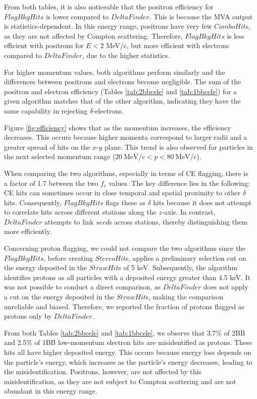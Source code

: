 From both tables, it is also noticeable that the positron 
efficiency for $FlagBkgHits$ is lower compared to $DeltaFinder$. 
This is because the MVA output is statistics-dependent. In this 
energy range, positrons have very few $ComboHit$s, as 
they are not affected by Compton scattering. Therefore, 
$FlagBkgHits$ is less efficient with positrons for $E < 2$ MeV/c, 
but more efficient with electrons compared to 
$DeltaFinder$, due to the higher statistics.

For higher momentum values, both algorithms perform similarly and the 
differences between positrons and electrons become negligible.  
The sum of the positron and electron efficiency (Tables \ref{tab:2bbcele} 
and \ref{tab:1bbcele}) for a given algorithm 
matches that of the other algorithm, indicating they have the same 
capability in rejecting $\delta$-electrons. 

Figure \ref{fig:efficiency} shows that as the momentum 
increases, the efficiency decreases. This occurs because 
higher momenta correspond to larger radii and a 
greater spread of hits on the $x$-$y$ plane. 
This trend is also observed for particles in the 
next selected momentum range ($20 \ \text{MeV/c} <p<80 \ \text{MeV/c}$).


When comparing the two algorithms, especially in terms of 
CE flagging, there is a factor of 1.7 between the 
two $f_e$ values. The key difference lies in the following: 
CE hits can sometimes occur in close temporal and spatial 
proximity to other $\delta$ hits. Consequently, $FlagBkgHits$ 
flags these as $\delta$ hits because it does not attempt to 
correlate hits across different stations along the $z$-axis. 
In contrast, $DeltaFinder$ attempts to link $seed$s 
across stations, thereby distinguishing them more efficiently.

Concerning proton flagging, we could not compare the two 
algorithms since the $FlagBkgHits$, before creating $StereoHit$s, 
applies a preliminary selection cut on the energy deposited in 
the $StrawHit$s of 5 keV. Subsequently, the algorithm identifies 
protons as all particles with a deposited energy greater than 
4.5 keV. It was not possible to conduct a direct comparison, 
as $DeltaFinder$ does not apply a cut on the energy deposited in 
the $StrawHit$s, making the comparison unreliable and biased. 
Therefore, we reported the fraction of protons 
flagged as protons only by $DeltaFinder$.

From both Tables \ref{tab:2bbcele} and \ref{tab:1bbcele}, 
we observe that 3.7\% of 2BB and 2.5\% of 1BB low-momentum 
electron hits are misidentified as protons. These hits all have 
higher deposited energy. This occurs because energy loss depends 
on the particle's energy, which increases as the particle's energy 
decreases, leading to the misidentification. Positrons, however, 
are not affected by this misidentification, as they are not 
subject to Compton scattering and are not abundant in this energy range.


